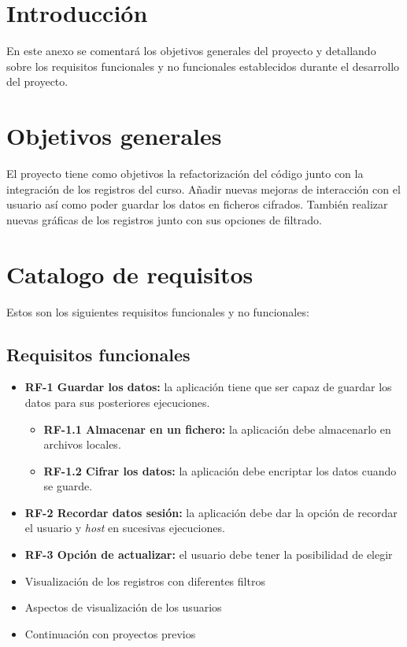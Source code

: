 
\section{Introducción}

En este anexo se comentará los objetivos generales del proyecto y detallando sobre los requisitos funcionales y no funcionales establecidos durante el desarrollo del proyecto.

\section{Objetivos generales}
El proyecto tiene como objetivos la refactorización del código junto con la integración de los registros del curso. Añadir nuevas mejoras de interacción con el usuario así como poder guardar los datos en ficheros cifrados. También realizar nuevas gráficas de los registros junto con sus opciones de filtrado.

\section{Catalogo de requisitos}

Estos son los siguientes requisitos funcionales y no funcionales:

\subsection{Requisitos funcionales}

\begin{itemize}
	

	\item \textbf{RF-1 Guardar los datos:} la aplicación tiene que ser capaz de guardar los datos para sus posteriores ejecuciones.
	\begin{itemize}
		\item \textbf{RF-1.1 Almacenar en un fichero:} la aplicación debe almacenarlo en archivos locales.
		\item \textbf{RF-1.2 Cifrar los datos:} la aplicación debe encriptar los datos cuando se guarde.
	\end{itemize}
	\item \textbf{RF-2 Recordar datos sesión:} la aplicación debe dar la opción de recordar el usuario y \textit{host} en sucesivas ejecuciones.
	\item \textbf{RF-3 Opción de actualizar:} el usuario debe tener la posibilidad de elegir 
	\item Visualización de los registros con diferentes filtros
	\item Aspectos de visualización de los usuarios
	\item Continuación con proyectos previos
	
	
	
\end{itemize}

